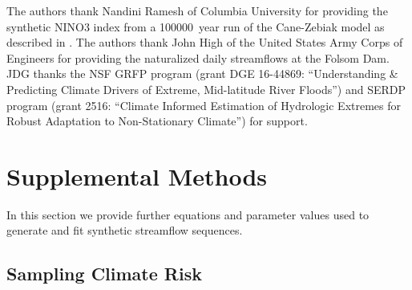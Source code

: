 \documentclass[
  draft,
  linenumbers
]{agujournal2018}
\begin{document}
\acknowledgments

The authors thank Nandini Ramesh of Columbia University for providing the synthetic NINO3 index from a \SI{100000}{year} run of the Cane-Zebiak model as described in \citet{Ramesh:2016hf}.
The authors thank John High of the United States Army Corps of Engineers for providing the naturalized daily streamflows at the Folsom Dam.
JDG thanks the NSF GRFP program (grant DGE 16-44869: ``Understanding \& Predicting Climate Drivers of Extreme, Mid-latitude River Floods'') and SERDP program (grant 2516: ``Climate Informed Estimation of Hydrologic Extremes for Robust Adaptation to Non-Stationary Climate'') for support.




\clearpage
\appendix

\renewcommand{\thefigure}{S\arabic{figure}}
\setcounter{figure}{0}
\renewcommand{\theequation}{S\arabic{equation}}
\setcounter{equation}{0}
\renewcommand{\thetable}{S\arabic{table}}
\setcounter{table}{0}

\section{Supplemental Methods}\label{sec:supp-methods}

In this section we provide further equations and parameter values used to generate and fit synthetic streamflow sequences.

\subsection{Sampling Climate Risk}\label{sec:supp-nino-spectrum}
\end{document}
